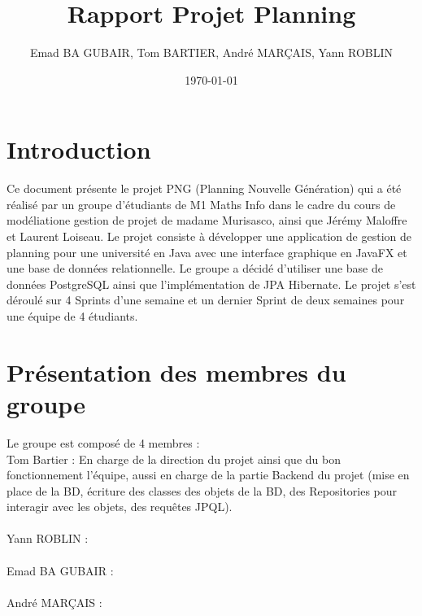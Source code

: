 \documentclass[a4paper,12pt]{article}
\title{Rapport Projet Planning}
\author{Emad BA GUBAIR, Tom BARTIER, André MARÇAIS, Yann ROBLIN}
\date{\today}
\begin{document}
\maketitle

\tableofcontents
\newpage
\section{Introduction}
Ce document présente le projet PNG (Planning Nouvelle Génération) qui a été réalisé par un groupe d'étudiants
de M1 Maths Info dans le cadre du cours de modéliatione gestion de projet de madame Murisasco, ainsi que 
Jérémy Maloffre et Laurent Loiseau. Le projet consiste à développer une application
de gestion de planning pour une université en Java avec une interface graphique en JavaFX et une base de données
relationnelle. Le groupe a décidé d'utiliser une base de données PostgreSQL ainsi que l'implémentation de JPA Hibernate.
Le projet s'est déroulé sur 4 Sprints d'une semaine et un dernier Sprint de deux semaines pour une équipe de 
4 étudiants.
\section{Présentation des membres du groupe}
Le groupe est composé de 4 membres :\\
Tom Bartier : En charge de la direction du projet ainsi que du bon fonctionnement l'équipe, aussi en charge de la partie
Backend du projet (mise en place de la BD, écriture des classes des objets de la BD, des Repositories pour interagir avec les objets, 
des requêtes JPQL).\\\\
Yann ROBLIN :   \\\\%
Emad BA GUBAIR :   \\\\%
André MARÇAIS :  \\\\%
\end{document}
